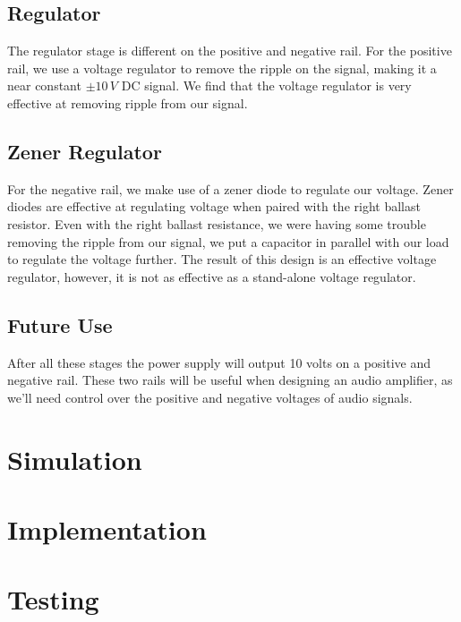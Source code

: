\documentclass{article}
\begin{document}
\subsection{Regulator}
The regulator stage is different on the positive and negative rail. For the positive rail, we use a voltage regulator to remove the ripple on the signal, making it a 
near constant $\pm10\,V$ DC signal. We find that the voltage regulator is very effective at removing ripple from our signal.

\subsection{Zener Regulator}
For the negative rail, we make use of a zener diode to regulate our voltage. Zener diodes are effective at regulating voltage when paired with the right ballast resistor. Even 
with the right ballast resistance, we were having some trouble removing the ripple from our signal, we put a capacitor in parallel with our load to regulate the voltage further. 
The result of this design is an effective voltage regulator, however, it is not as effective as a stand-alone voltage regulator.

\subsection{Future Use}
After all these stages the power supply will output 10 volts on a positive and negative rail. These two rails will be useful when designing an audio amplifier, as we'll need control over the 
positive and negative voltages of audio signals.


\section{Simulation}

\section{Implementation}

\section{Testing}
\end{document}
